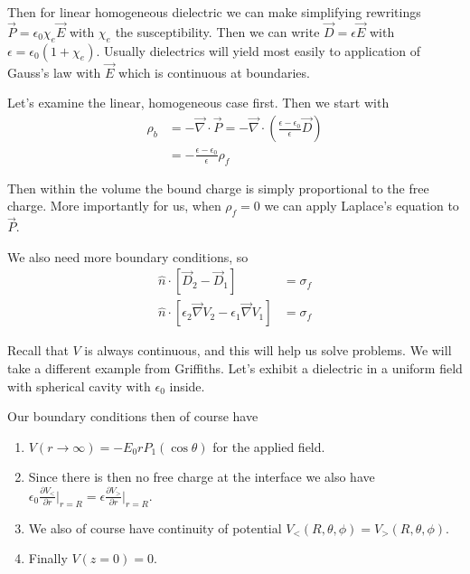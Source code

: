 \documentclass[10pt]{report}
\newcommand{\pd}[2]{\frac{\partial #1}{\partial#2}}
\begin{document}
Then for linear homogeneous dielectric we can make simplifying rewritings $\vec{P} = \epsilon_0\chi_e\vec{E}$ with $\chi_e$ the susceptibility. Then we can write $\vec{D} = \epsilon\vec{E}$ with $\epsilon = \epsilon_0(1 + \chi_e)$. Usually dielectrics will yield most easily to application of Gauss's law with $\vec{E}$ which is continuous at boundaries.

Let's examine the linear, homogeneous case first. Then we start with
\begin{align}
    \rho_b &= -\vec{\nabla}\cdot \vec{P} = -\vec{\nabla}\cdot\left( \frac{\epsilon - \epsilon_0}{\epsilon}\vec{D} \right)\\
    &= -\frac{\epsilon - \epsilon_0}{\epsilon}\rho_f
\end{align}

Then within the volume the bound charge is simply proportional to the free charge. More importantly for us, when $\rho_f = 0$ we can apply Laplace's equation to $\vec{P}$.

We also need more boundary conditions, so 
\begin{align}
    \hat{n}\cdot [\vec{D}_2 - \vec{D}_1] &= \sigma_f\\
    \hat{n}\cdot \left[ \epsilon_2\vec{\nabla}V_2 - \epsilon_1\vec{\nabla}V_1 \right] &= \sigma_f
\end{align}

Recall that $V$ is always continuous, and this will help us solve problems. We will take a different example from Griffiths. Let's exhibit a dielectric in a uniform field with spherical cavity with $\epsilon_0$ inside.

Our boundary conditions then of course have 
\begin{enumerate}
    \item $V(r \to \infty) = -E_0rP_1(\cos\theta)$ for the applied field. 
    \item Since there is then no free charge at the interface we also have $\epsilon_0\pd{V_<}{r}\Big|_{r = R} = \epsilon \pd{V_>}{r}\Big|_{r = R}$. 
    \item We also of course have continuity of potential $V_<(R,\theta,\phi) = V_>(R, \theta, \phi)$.
    \item Finally $V(z=0) = 0$.
\end{enumerate}
\end{document}

